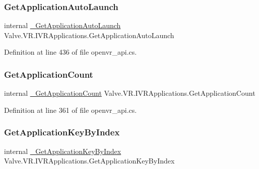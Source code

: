 \subsubsection{\texorpdfstring{GetApplicationAutoLaunch}{GetApplicationAutoLaunch}}
{\footnotesize\ttfamily internal \mbox{\hyperlink{struct_valve_1_1_v_r_1_1_i_v_r_applications_ae7b3dd42def4887d70c2856b79679c8a}{\+\_\+\+Get\+Application\+Auto\+Launch}} Valve.\+V\+R.\+I\+V\+R\+Applications.\+Get\+Application\+Auto\+Launch}



Definition at line 436 of file openvr\+\_\+api.\+cs.

\mbox{\label{struct_valve_1_1_v_r_1_1_i_v_r_applications_a22aee0bcc514fa894b599b58ee72e4da}} 
\subsubsection{\texorpdfstring{GetApplicationCount}{GetApplicationCount}}
{\footnotesize\ttfamily internal \mbox{\hyperlink{struct_valve_1_1_v_r_1_1_i_v_r_applications_ad5a465e75026a5c1bf8e787a8613132b}{\+\_\+\+Get\+Application\+Count}} Valve.\+V\+R.\+I\+V\+R\+Applications.\+Get\+Application\+Count}



Definition at line 361 of file openvr\+\_\+api.\+cs.

\mbox{\label{struct_valve_1_1_v_r_1_1_i_v_r_applications_ae3a1cf0df983ee26ce4300144aff769d}} 
\subsubsection{\texorpdfstring{GetApplicationKeyByIndex}{GetApplicationKeyByIndex}}
{\footnotesize\ttfamily internal \mbox{\hyperlink{struct_valve_1_1_v_r_1_1_i_v_r_applications_a63e1092a4592ad95064f4948b5bc743f}{\+\_\+\+Get\+Application\+Key\+By\+Index}} Valve.\+V\+R.\+I\+V\+R\+Applications.\+Get\+Application\+Key\+By\+Index}



